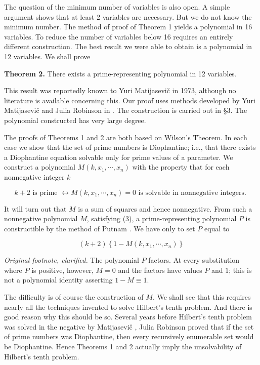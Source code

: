\documentclass[10pt,letterpaper]{article}
\newcommand{\origpage}[1]{\marginnote{\footnotesize\textbf{[#1]}}}
\newcommand{\statement}[1]{\par\medskip\noindent\textbf{#1}\enspace}
\begin{document}
The question of the minimum number of variables is also open. A simple argument shows that at least 2 variables are necessary. But we do not know the minimum number. The method of proof of Theorem 1 yields a polynomial in 16 variables. To reduce the number of variables below 16 requires an entirely different construction. The best result we were able to obtain is a polynomial in 12 variables. We shall prove

\statement{Theorem 2.} There exists a prime-representing polynomial in 12 variables.


This result was reportedly known to Yuri Matijasevič in 1973, although no literature is available concerning this. Our proof uses methods developed by Yuri Matijasevič and Julia Robinson in \cite{ref11}. The construction is carried out in §3. The polynomial constructed has very large degree.

The proofs of Theorems 1 and 2 are both based on Wilson's Theorem. In each case we show that the set of prime numbers is Diophantine; i.e., that there exists a Diophantine equation solvable only for prime values of a parameter. We construct a polynomial $M\left(k, x_{1}, \cdots, x_{n}\right)$ with the property that for each nonnegative integer $k$


\begin{equation*}
k+2 \text { is prime } \leftrightarrow M\left(k, x_{1}, \cdots, x_{n}\right)=0 \text { is solvable in nonnegative integers. } \tag{3}
\end{equation*}


\origpage{450}It will turn out that $M$ is a sum of squares and hence nonnegative. From such a nonnegative polynomial $M$, satisfying (3), a prime-representing polynomial $P$ is constructible by the method of Putnam \cite{ref12}. We have only to set $P$ equal to


\begin{equation*}
(k+2)\left\{1-M\left(k, x_{1}, \cdots, x_{n}\right)\right\} \tag{4}
\end{equation*}


{\footnotesize\noindent\textit{Original footnote, clarified.}
The polynomial $P$ factors. At every substitution where $P$ is positive, however,
$M=0$ and the factors have values $P$ and $1$; this is not a polynomial identity
asserting $1-M\equiv1$.\par}

The difficulty is of course the construction of $M$. We shall see that this requires nearly all the techniques invented to solve Hilbert's tenth problem. And there is good reason why this should be so. Several years before Hilbert's tenth problem was solved in the negative by Matijasevič \cite{ref8}, Julia Robinson \cite{ref16} proved that if the set of prime numbers was Diophantine, then every recursively enumerable set would be Diophantine. Hence Theorems 1 and 2 actually imply the unsolvability of Hilbert's tenth problem.
\end{document}
